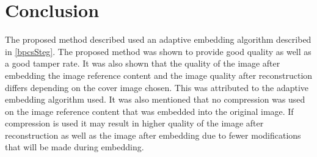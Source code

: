 \documentclass[12pt]{article}
\begin{document}
\section{Conclusion}
The proposed method described used an adaptive embedding algorithm described in \ref{bpcsSteg}.
The proposed method was shown to provide good quality as well as a good tamper rate.
It was also shown that the quality of the image after embedding the image reference content and the image quality after reconstruction differs depending on the cover image chosen.
This was attributed to the adaptive embedding algorithm used.
It was also mentioned that no compression was used on the image reference content that was embedded into the original image.
If compression is used it may result in higher quality of the image after reconstruction as well as the image after embedding due to fewer modifications that will be made during embedding.



\end{document}
